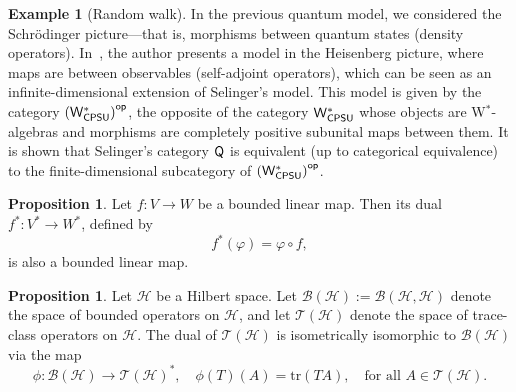 \documentclass[10pt,a4paper]{amsart}
\theoremstyle{definition}
\theoremstyle{definition}
\newtheorem{example}[definition]{Example}
\theoremstyle{definition}
\theoremstyle{definition}
\newtheorem{proposition}[definition]{Proposition}
\theoremstyle{definition}
\theoremstyle{definition}
\begin{document}
\begin{example}[Random walk]
In the previous quantum model, we considered the Schr\"odinger picture---that is, morphisms between quantum states (\ie density operators). In~\cite{choSemanticsQuantumProgramming2016}, the author presents a model in the Heisenberg picture, where maps are between observables (\ie self-adjoint operators), which can be seen as an infinite-dimensional extension of Selinger’s model. This model is given by the category $\left(\mathsf{W^*_{CPSU}}\right)^{\mathsf{op}}$, the opposite of the category $\mathsf{W^*_{CPSU}}$ whose objects are W$^*$-algebras and morphisms are completely positive subunital maps between them. It is shown that Selinger’s category $\mathsf{Q}$ is equivalent (up to categorical equivalence) to the finite-dimensional subcategory of $\left(\mathsf{W^*_{CPSU}}\right)^{\mathsf{op}}$.











\begin{proposition} \cite[Proposition 2.3.10]{pedersenAnalysisNow1989}
Let \( f : V \to W \) be a bounded linear map. Then its dual \( f^* : V^* \to W^* \), defined by
\[
f^*(\varphi) = \varphi \circ f,
\]
is also a bounded linear map.
\end{proposition}

\begin{proposition} \cite[Theorem 19.2]{conwayCourseOperatorTheory2000}
  Let \(\mathcal{H}\) be a Hilbert space. Let \(\mathcal{B}(\mathcal{H}) := \mathcal{B}(\mathcal{H}, \mathcal{H})\) denote the space of bounded operators on \(\mathcal{H}\), and let \(\mathcal{T}(\mathcal{H})\) denote the space of trace-class operators on \(\mathcal{H}\).
    The dual of \(\mathcal{T}(\mathcal{H})\) is isometrically isomorphic to \(\mathcal{B}(\mathcal{H})\) via the map
    \[
    \phi : \mathcal{B}(\mathcal{H}) \to \mathcal{T}(\mathcal{H})^*, \quad \phi(T)(A) = \mathrm{tr}(TA), \quad \text{for all } A \in \mathcal{T}(\mathcal{H}).
    \]
\end{proposition}



\end{example}
\end{document}
